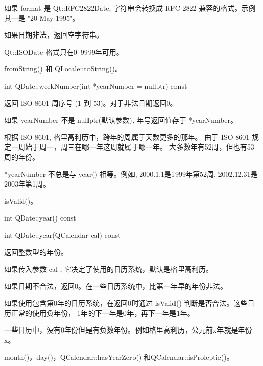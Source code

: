 如果 format 是 Qt::RFC2822Date, 字符串会转换成 RFC 2822 兼容的格式。示例其一是 "20 May 1995"。

如果日期非法，返回空字符串。


\begin{notice}[警告]
Qt::ISODate 格式只在0~9999年可用。
\end{notice}

\begin{notice}[另请参阅]
fromString() 和 QLocale::toString()。
\end{notice}


\splitLine

int QDate::weekNumber(int *yearNumber = nullptr) const

返回 ISO 8601 周序号 (1 到 53)。对于非法日期返回0。

如果 yearNumber 不是 nullptr(默认参数), 年号返回值存于 *yearNumber。

根据 ISO 8601, 格里高利历中，跨年的周属于天数更多的那年。 由于 ISO 8601 规定一周始于周一，周三在哪一年这周就属于哪一年。 大多数年有52周，但也有53周的年份。

\begin{notice}
 *yearNumber 不总是与 year() 相等。例如, 2000.1.1是1999年第52周, 2002.12.31是2003年第1周。
\end{notice}

\begin{notice}[另请参阅]
isValid()。
\end{notice}

\splitLine

int QDate::year() const

int QDate::year(QCalendar cal) const

返回整数型的年份。

如果传入参数 cal , 它决定了使用的日历系统，默认是格里高利历。

如果日期不合法，返回0。在一些日历系统中，比第一年早的年份非法。

如果使用包含第0年的日历系统，在返回0时通过 isValid() 判断是否合法。这些日历正常的使用负年份，-1年的下一年是0年，再下一年是1年。

一些日历中，没有0年份但是有负数年份。例如格里高利历，公元前x年就是年份-x。

\begin{notice}[另请参阅]
month()，day()，QCalendar::hasYearZero() 和QCalendar::isProleptic()。
\end{notice}



\splitLine

